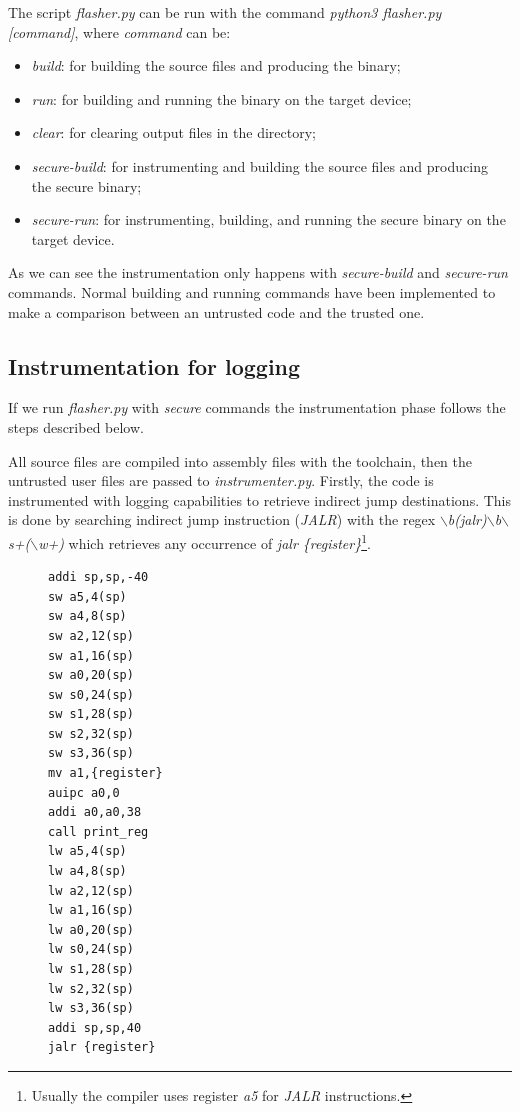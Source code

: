 The script \textit{flasher.py} can be run with the command \textit{python3
flasher.py [command]}, where \textit{command} can be:
\begin{itemize}[noitemsep]
  \item \textit{build}: for building the source files and producing the binary;

  \item \textit{run}: for building and running the binary on the target device;

  \item \textit{clear}: for clearing output files in the directory;

  \item \textit{secure-build}: for instrumenting and building the source files and
    producing the secure binary;

  \item \textit{secure-run}: for instrumenting, building, and running the secure
    binary on the target device.
\end{itemize}

As we can see the instrumentation only happens with \textit{secure-build} and
\textit{secure-run} commands. Normal building and running commands have been
implemented to make a comparison between an untrusted code and the trusted one.

\subsection{Instrumentation for logging}
\label{subsec:logging}

If we run \textit{flasher.py} with \textit{secure} commands the instrumentation phase
follows the steps described below.

All source files are compiled into assembly files with the toolchain, then the
untrusted user files are passed to \textit{instrumenter.py}. Firstly, the code is
instrumented with logging capabilities to retrieve indirect jump destinations.
This is done by searching indirect jump instruction (\textit{JALR}) with the regex
\textit{$\backslash$b(jalr)$\backslash$b$\backslash$s+($\backslash$w+)} which
retrieves any occurrence of \textit{jalr \{register\}}\footnote{Usually the
compiler uses register \textit{a5} for \textit{JALR} instructions.}.

\begin{figure}
  \setlength{\intextsep}{0pt}
  \begin{minipage}{0.25\textwidth}
    \begin{lstlisting}[style=Assembly, caption = Logging code block, label={lst:loggingblock}]
addi sp,sp,-40
sw a5,4(sp)
sw a4,8(sp)
sw a2,12(sp)
sw a1,16(sp)
sw a0,20(sp)
sw s0,24(sp)
sw s1,28(sp)
sw s2,32(sp)
sw s3,36(sp)
mv a1,{register}
auipc a0,0
addi a0,a0,38
call print_reg
lw a5,4(sp)
lw a4,8(sp)
lw a2,12(sp)
lw a1,16(sp)
lw a0,20(sp)
lw s0,24(sp)
lw s1,28(sp)
lw s2,32(sp)
lw s3,36(sp)
addi sp,sp,40
jalr {register}
    \end{lstlisting}
  \end{minipage}
\end{figure}

